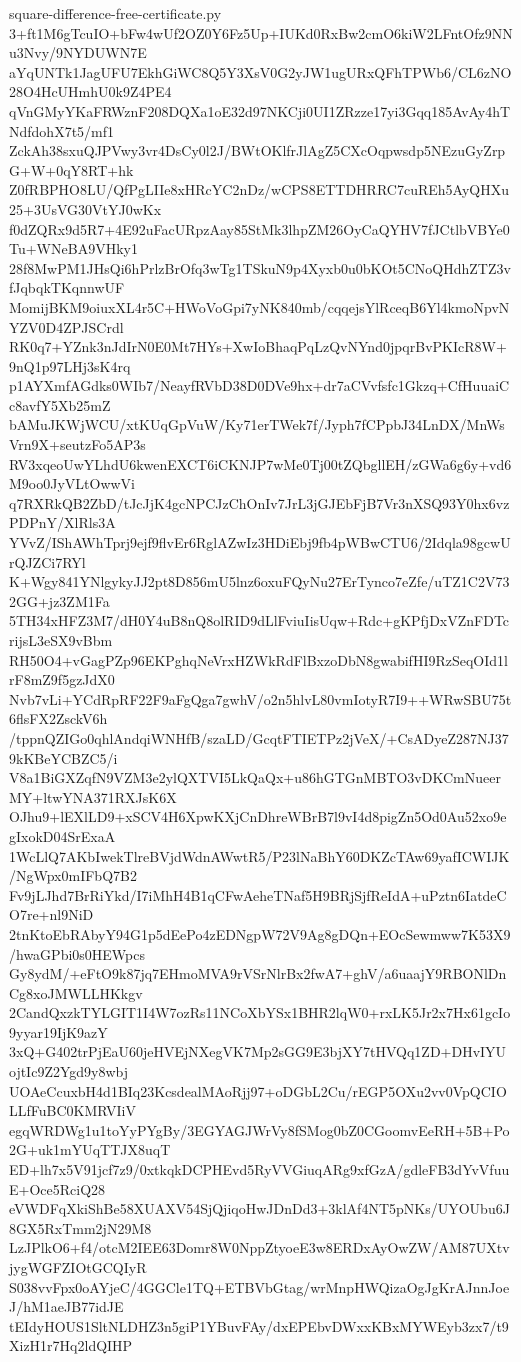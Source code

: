 \documentclass[11pt]{article}
\theoremstyle{definition}
\theoremstyle{remark}
\begin{document}
\begin{filecontents*}[overwrite]{square-difference-free-certificate.py}
3+ft1M6gTcuIO+bFw4wUf2OZ0Y6Fz5Up+IUKd0RxBw2cmO6kiW2LFntOfz9NNu3Nvy/9NYDUWN7E
aYqUNTk1JagUFU7EkhGiWC8Q5Y3XsV0G2yJW1ugURxQFhTPWb6/CL6zNO28O4HcUHmhU0k9Z4PE4
qVnGMyYKaFRWznF208DQXa1oE32d97NKCji0UI1ZRzze17yi3Gqq185AvAy4hTNdfdohX7t5/mf1
ZckAh38sxuQJPVwy3vr4DsCy0l2J/BWtOKlfrJlAgZ5CXcOqpwsdp5NEzuGyZrpG+W+0qY8RT+hk
Z0fRBPHO8LU/QfPgLIIe8xHRcYC2nDz/wCPS8ETTDHRRC7cuREh5AyQHXu25+3UsVG30VtYJ0wKx
f0dZQRx9d5R7+4E92uFacURpzAay85StMk3lhpZM26OyCaQYHV7fJCtlbVBYe0Tu+WNeBA9VHky1
28f8MwPM1JHsQi6hPrlzBrOfq3wTg1TSkuN9p4Xyxb0u0bKOt5CNoQHdhZTZ3vfJqbqkTKqnnwUF
MomijBKM9oiuxXL4r5C+HWoVoGpi7yNK840mb/cqqejsYlRceqB6Yl4kmoNpvNYZV0D4ZPJSCrdl
RK0q7+YZnk3nJdIrN0E0Mt7HYs+XwIoBhaqPqLzQvNYnd0jpqrBvPKIcR8W+9nQ1p97LHj3sK4rq
p1AYXmfAGdks0WIb7/NeayfRVbD38D0DVe9hx+dr7aCVvfsfc1Gkzq+CfHuuaiCc8avfY5Xb25mZ
bAMuJKWjWCU/xtKUqGpVuW/Ky71erTWek7f/Jyph7fCPpbJ34LnDX/MnWsVrn9X+seutzFo5AP3s
RV3xqeoUwYLhdU6kwenEXCT6iCKNJP7wMe0Tj00tZQbgllEH/zGWa6g6y+vd6M9oo0JyVLtOwwVi
q7RXRkQB2ZbD/tJcJjK4gcNPCJzChOnIv7JrL3jGJEbFjB7Vr3nXSQ93Y0hx6vzPDPnY/XlRls3A
YVvZ/IShAWhTprj9ejf9flvEr6RglAZwIz3HDiEbj9fb4pWBwCTU6/2Idqla98gcwUrQJZCi7RYl
K+Wgy841YNlgykyJJ2pt8D856mU5lnz6oxuFQyNu27ErTynco7eZfe/uTZ1C2V732GG+jz3ZM1Fa
5TH34xHFZ3M7/dH0Y4uB8nQ8olRID9dLlFviuIisUqw+Rdc+gKPfjDxVZnFDTcrijsL3eSX9vBbm
RH50O4+vGagPZp96EKPghqNeVrxHZWkRdFlBxzoDbN8gwabifHI9RzSeqOId1lrF8mZ9f5gzJdX0
Nvb7vLi+YCdRpRF22F9aFgQga7gwhV/o2n5hlvL80vmIotyR7I9++WRwSBU75t6flsFX2ZsckV6h
/tppnQZIGo0qhlAndqiWNHfB/szaLD/GcqtFTIETPz2jVeX/+CsADyeZ287NJ379kKBeYCBZC5/i
V8a1BiGXZqfN9VZM3e2ylQXTVI5LkQaQx+u86hGTGnMBTO3vDKCmNueerMY+ltwYNA371RXJsK6X
OJhu9+lEXlLD9+xSCV4H6XpwKXjCnDhreWBrB7l9vI4d8pigZn5Od0Au52xo9egIxokD04SrExaA
1WcLlQ7AKbIwekTlreBVjdWdnAWwtR5/P23lNaBhY60DKZcTAw69yafICWIJK/NgWpx0mIFbQ7B2
Fv9jLJhd7BrRiYkd/I7iMhH4B1qCFwAeheTNaf5H9BRjSjfReIdA+uPztn6IatdeCO7re+nl9NiD
2tnKtoEbRAbyY94G1p5dEePo4zEDNgpW72V9Ag8gDQn+EOcSewmww7K53X9/hwaGPbi0s0HEWpcs
Gy8ydM/+eFtO9k87jq7EHmoMVA9rVSrNlrBx2fwA7+ghV/a6uaajY9RBONlDnCg8xoJMWLLHKkgv
2CandQxzkTYLGIT1I4W7ozRs11NCoXbYSx1BHR2lqW0+rxLK5Jr2x7Hx61gcIo9yyar19IjK9azY
3xQ+G402trPjEaU60jeHVEjNXegVK7Mp2sGG9E3bjXY7tHVQq1ZD+DHvIYUojtIc9Z2Ygd9y8wbj
UOAeCcuxbH4d1BIq23KcsdealMAoRjj97+oDGbL2Cu/rEGP5OXu2vv0VpQCIOLLfFuBC0KMRVIiV
egqWRDWg1u1toYyPYgBy/3EGYAGJWrVy8fSMog0bZ0CGoomvEeRH+5B+Po2G+uk1mYUqTTJX8uqT
ED+lh7x5V91jcf7z9/0xtkqkDCPHEvd5RyVVGiuqARg9xfGzA/gdleFB3dYvVfuuE+Oce5RciQ28
eVWDFqXkiShBe58XUAXV54SjQjiqoHwJDnDd3+3klAf4NT5pNKs/UYOUbu6J8GX5RxTmm2jN29M8
LzJPlkO6+f4/otcM2IEE63Domr8W0NppZtyoeE3w8ERDxAyOwZW/AM87UXtvjygWGFZIOtGCQIyR
S038vvFpx0oAYjeC/4GGCle1TQ+ETBVbGtag/wrMnpHWQizaOgJgKrAJnnJoeJ/hM1aeJB77idJE
tEIdyHOUS1SltNLDHZ3n5giP1YBuvFAy/dxEPEbvDWxxKBxMYWEyb3zx7/t9XizH1r7Hq2ldQIHP

\end{filecontents*}
\end{document}
